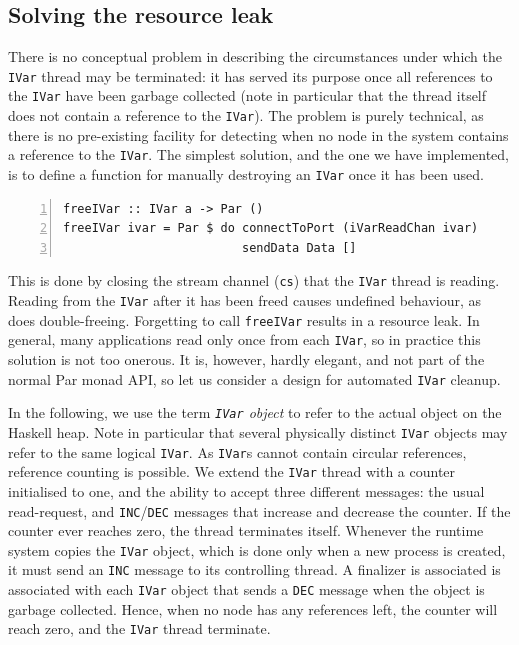 \documentclass[a4paper, oneside, final]{article}
\begin{document}
\subsection{Solving the resource leak}

There is no conceptual problem in describing the circumstances under
which the \texttt{IVar} thread may be terminated: it has served its
purpose once all references to the \texttt{IVar} have been garbage
collected (note in particular that the thread itself does not contain
a reference to the \texttt{IVar}).  The problem is purely technical,
as there is no pre-existing facility for detecting when no node in the
system contains a reference to the \texttt{IVar}.  The simplest
solution, and the one we have implemented, is to define a function for
manually destroying an \texttt{IVar} once it has been used.

\begin{lstlisting}[numbers=left, numberstyle=\tiny]
freeIVar :: IVar a -> Par ()
freeIVar ivar = Par $ do connectToPort (iVarReadChan ivar)
                         sendData Data []
\end{lstlisting}

This is done by closing the stream channel (\texttt{cs}) that the
\texttt{IVar} thread is reading.  Reading from the \texttt{IVar} after
it has been freed causes undefined behaviour, as does double-freeing.
Forgetting to call \texttt{freeIVar} results in a resource leak.  In
general, many applications read only once from each \texttt{IVar}, so
in practice this solution is not too onerous.  It is, however, hardly
elegant, and not part of the normal Par monad API, so let us consider
a design for automated \texttt{IVar} cleanup.

In the following, we use the term \textit{\texttt{IVar} object} to
refer to the actual object on the Haskell heap.  Note in particular
that several physically distinct \texttt{IVar} objects may refer to
the same logical \texttt{IVar}.  As \texttt{IVar}s cannot contain
circular references, reference counting is possible.  We extend the
\texttt{IVar} thread with a counter initialised to one, and the
ability to accept three different messages: the usual read-request,
and \texttt{INC}/\texttt{DEC} messages that increase and decrease the
counter.  If the counter ever reaches zero, the thread terminates
itself.  Whenever the runtime system copies the \texttt{IVar} object,
which is done only when a new process is created, it must send an
\texttt{INC} message to its controlling thread.  A finalizer is
associated is associated with each \texttt{IVar} object that sends a
\texttt{DEC} message when the object is garbage collected.  Hence,
when no node has any references left, the counter will reach zero, and
the \texttt{IVar} thread terminate.
\end{document}
